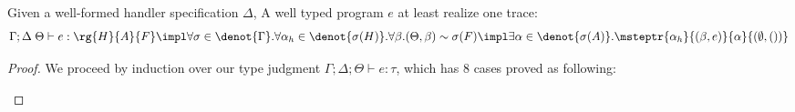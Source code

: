 \begin{theorem}[Realizability]\label{theorem:realizable} Given a well-formed handler specification $\Delta$, A well typed program $e$ at least realize one trace:
 {\small\begin{align*} 
 \Gamma;\Delta\;\Theta \vdash e : \rg{H}{A}{F} \impl 
 \forall \sigma \in \denot{\Gamma}.\forall \alpha_h \in \denot{\sigma(H)}. \forall \beta. (\Theta, \beta) \sim \sigma(F) \impl \exists \alpha \in\denot{\sigma(A)}. \msteptr{\alpha_h}{(\beta, e)}{\alpha}{(\emptyset, ())}
\end{align*}}
\end{theorem}
\begin{proof} We proceed by induction over our type judgment $\Gamma;\Delta;\Theta \vdash e : \tau$, which has $8$ cases proved as following:
\begin{enumerate}[label=Case]


\end{enumerate}
\end{proof}
